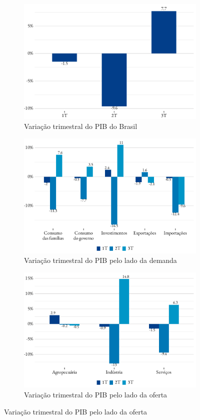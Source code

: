 \begin{figure}[!h]
	\begin{subfigure}{\linewidth}
		\caption{Variação trimestral do PIB do Brasil}
		\includegraphics{fig/pib_total.pdf}
	\end{subfigure}
	\begin{subfigure}{\linewidth}
		\caption{Variação trimestral do PIB pelo lado da demanda}
		\includegraphics{fig/pib_demanda.pdf}
	\end{subfigure}
	\begin{subfigure}{\linewidth}
		\caption{Variação trimestral do PIB pelo lado da oferta}
		\includegraphics{fig/pib_oferta.pdf}

\end{subfigure}
\end{figure}
